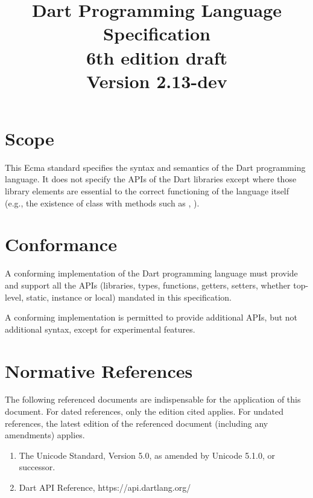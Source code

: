 \documentclass[makeidx]{article}
\title{Dart Programming Language Specification\\
{6th edition draft}\\
{\large Version 2.13-dev}}
\author{}
\begin{document}
\maketitle
\setlength{\cftsubsecnumwidth}{2.7em}
\setlength{\cftsubsubsecnumwidth}{3.4em}
\tableofcontents

\newpage

\pagestyle{myheadings}


\section{Scope}

\LMHash{}%
This Ecma standard specifies the syntax and semantics of
the Dart programming language.
It does not specify the APIs of the Dart libraries
except where those library elements are essential to
the correct functioning of the language itself
(e.g., the existence of class  with methods
such as , ).


\section{Conformance}

\LMHash{}%
A conforming implementation of the Dart programming language
must provide and support all the APIs
(libraries, types, functions, getters, setters,
whether top-level, static, instance or local)
mandated in this specification.

\LMHash{}%
A conforming implementation is permitted to provide additional APIs,
but not additional syntax,
except for experimental features.


\section{Normative References}

\LMHash{}%
The following referenced documents are indispensable for
the application of this document.
For dated references, only the edition cited applies.
For undated references, the latest edition of the referenced document
(including any amendments) applies.

\begin{enumerate}
\item
  The Unicode Standard, Version 5.0, as amended by Unicode 5.1.0, or successor.
\item
  Dart API Reference, https://api.dartlang.org/
\end{enumerate}
\end{document}
